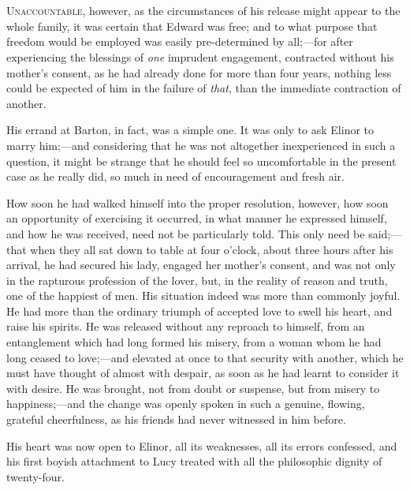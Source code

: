 \chapter[Chapter \thechapter]{}
\lettrine[lraise=0.3]{U}{naccountable}, however, as the circumstances of his release might appear to the whole family, it was certain that Edward was free; and to what purpose that freedom would be employed was easily pre-determined by all;—for after experiencing the blessings of \textit{one} imprudent engagement, contracted without his mother's consent, as he had already done for more than four years, nothing less could be expected of him in the failure of \textit{that}, than the immediate contraction of another.

His errand at Barton, in fact, was a simple one. It was only to ask Elinor to marry him;—and considering that he was not altogether inexperienced in such a question, it might be strange that he should feel so uncomfortable in the present case as he really did, so much in need of encouragement and fresh air.

How soon he had walked himself into the proper resolution, however, how soon an opportunity of exercising it occurred, in what manner he expressed himself, and how he was received, need not be particularly told. This only need be said;—that when they all sat down to table at four o'clock, about three hours after his arrival, he had secured his lady, engaged her mother's consent, and was not only in the rapturous profession of the lover, but, in the reality of reason and truth, one of the happiest of men. His situation indeed was more than commonly joyful. He had more than the ordinary triumph of accepted love to swell his heart, and raise his spirits. He was released without any reproach to himself, from an entanglement which had long formed his misery, from a woman whom he had long ceased to love;—and elevated at once to that security with another, which he must have thought of almost with despair, as soon as he had learnt to consider it with desire. He was brought, not from doubt or suspense, but from misery to happiness;—and the change was openly spoken in such a genuine, flowing, grateful cheerfulness, as his friends had never witnessed in him before.

His heart was now open to Elinor, all its weaknesses, all its errors confessed, and his first boyish attachment to Lucy treated with all the philosophic dignity of twenty-four.


